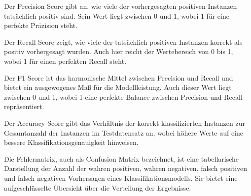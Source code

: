 Der Precision Score gibt an, wie viele der vorhergesagten positiven Instanzen tatsächlich positiv sind. Sein Wert liegt zwischen 0 und 1, wobei 1 für eine perfekte Präzision steht.

Der Recall Score zeigt, wie viele der tatsächlich positiven Instanzen korrekt als positiv vorhergesagt wurden. Auch hier reicht der Wertebereich von 0 bis 1, wobei 1 für einen perfekten Recall steht.

Der F1 Score ist das harmonische Mittel zwischen Precision und Recall und bietet ein ausgewogenes Maß für die Modellleistung. Auch dieser Wert liegt zwischen 0 und 1, wobei 1 eine perfekte Balance zwischen Precision und Recall repräsentiert.

Der Accuracy Score gibt das Verhältnis der korrekt klassifizierten Instanzen zur Gesamtanzahl der Instanzen im Testdatensatz an, wobei höhere Werte auf eine bessere Klassifikationsgenauigkeit hinweisen.

Die Fehlermatrix, auch als Confusion Matrix bezeichnet, ist eine tabellarische Darstellung der Anzahl der wahren positiven, wahren negativen, falsch positiven und falsch negativen Vorhersagen eines Klassifikationsmodells. Sie bietet eine aufgeschlüsselte Übersicht über die Verteilung der Ergebnisse.




